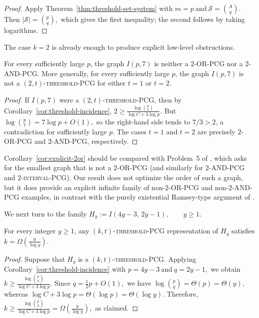 \documentclass[a4paper,UKenglish,cleveref,autoref,thm-restate]{socg-lipics-v2021}
\begin{document}
\begin{proof}
Apply Theorem~\ref{thm:threshold-set-system} with
\(
m=p
\ \text{and}\ 
\mathcal S=\binom{A}{q}.
\)
Then
\(
|\mathcal S|=\binom{p}{q},
\)
which gives the first inequality; the second follows by taking logarithms.
\end{proof}

The case $k=2$ is already enough to produce explicit low-level obstructions.

\begin{corollary}\label{cor:explicit-2or}
For every sufficiently large $p$, the graph $I(p,7)$ is neither a
\textsc{$2$-\textsc{OR}-\textsc{PCG}} nor a \textsc{$2$-\textsc{AND}-\textsc{PCG}}.
More generally, for every sufficiently large $p$, the graph $I(p,7)$ is not a
\textsc{$(2,t)$-threshold-\textsc{PCG}} for either $t=1$ or $t=2$.
\end{corollary}

\begin{proof}
If $I(p,7)$ were a \textsc{$(2,t)$-threshold-\textsc{PCG}}, then by
Corollary~\ref{cor:threshold-incidence},
\(
2\ge \frac{\log \binom{p}{7}}{\log C + 3\log p}.
\)
But
\(
\log \binom{p}{7}=7\log p + O(1),
\)
so the right-hand side tends to $7/3>2$, a contradiction for sufficiently large $p$.
The cases $t=1$ and $t=2$ are precisely \textsc{$2$-\textsc{OR}-\textsc{PCG}} and
\textsc{$2$-\textsc{AND}-\textsc{PCG}}, respectively.
\end{proof}

Corollary~\ref{cor:explicit-2or} should be compared with Problem~5 of
\cite{Calamoneri2021OnGOI}, which asks for the smallest graph that is not a
\textsc{$2$-\textsc{OR}-\textsc{PCG}} (and similarly for
\textsc{$2$-\textsc{AND}-\textsc{PCG}} and \textsc{$2$-interval-\textsc{PCG}}). Our
result does not optimize the order of such a graph, but it does provide an explicit
infinite family of non-\textsc{$2$-\textsc{OR}-\textsc{PCG}} and
non-\textsc{$2$-\textsc{AND}-\textsc{PCG}} examples, in contrast with the purely
existential Ramsey-type argument of \cite{Calamoneri2021OnGOI}.

We next turn to the family
\(
H_y:=I(4y-3,\,2y-1),
\qquad y\ge 1.
\)

\begin{corollary}\label{cor:Hk-threshold}
For every integer \(y\ge 1\), any \textsc{$(k,t)$-threshold-\textsc{PCG}}
representation of \(H_y\) satisfies
\(
k=\Omega\!\left(\frac{y}{\log y}\right).
\)
\end{corollary}

\begin{proof}
Suppose that \(H_y\) is a \textsc{$(k,t)$-threshold-\textsc{PCG}}. Applying
Corollary~\ref{cor:threshold-incidence} with
\(
p=4y-3
\ \text{and}\ 
q=2y-1,
\)
we obtain
\(
k\ge \frac{\log \binom{p}{q}}{\log C + 3\log p}.
\)
Since
\(
q=\frac12 p+O(1),
\)
we have
\(
\log \binom{p}{q}=\Theta(p)=\Theta(y),
\)
whereas
\(
\log C + 3\log p=\Theta(\log p)=\Theta(\log y).
\)
Therefore,
\(
k\ge \frac{\log \binom{p}{q}}{\log C + 3\log p}
  = \Omega\!\left(\frac{y}{\log y}\right),
\)
as claimed.
\end{proof}
\end{document}
